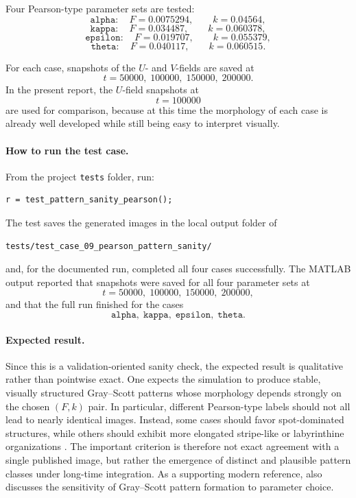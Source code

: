 Four Pearson-type parameter sets are tested:
\[
\texttt{alpha}: \quad F=0.0075294,\qquad k=0.04564,
\]
\[
\texttt{kappa}: \quad F=0.034487,\qquad k=0.060378,
\]
\[
\texttt{epsilon}: \quad F=0.019707,\qquad k=0.055379,
\]
\[
\texttt{theta}: \quad F=0.040117,\qquad k=0.060515.
\]

For each case, snapshots of the \(U\)- and \(V\)-fields are saved at
\[
t = 50000,\;100000,\;150000,\;200000.
\]
In the present report, the \(U\)-field snapshots at
\[
t = 100000
\]
are used for comparison, because at this time the morphology of each case is already well developed while still being easy to interpret visually.

\paragraph{How to run the test case.}
From the project \texttt{tests} folder, run:
\begin{verbatim}
r = test_pattern_sanity_pearson();
\end{verbatim}

The test saves the generated images in the local output folder of
\begin{verbatim}
tests/test_case_09_pearson_pattern_sanity/
\end{verbatim}
and, for the documented run, completed all four cases successfully. The MATLAB output reported that snapshots were saved for all four parameter sets at
\[
t=50000,\;100000,\;150000,\;200000,
\]
and that the full run finished for the cases
\[
\texttt{alpha},\;\texttt{kappa},\;\texttt{epsilon},\;\texttt{theta}.
\]

\paragraph{Expected result.}
Since this is a validation-oriented sanity check, the expected result is qualitative rather than pointwise exact. One expects the simulation to produce stable, visually structured Gray--Scott patterns whose morphology depends strongly on the chosen \((F,k)\) pair. In particular, different Pearson-type labels should not all lead to nearly identical images. Instead, some cases should favor spot-dominated structures, while others should exhibit more elongated stripe-like or labyrinthine organizations \cite{pearson1993,munafo_gray_scott_classes}. The important criterion is therefore not exact agreement with a single published image, but rather the emergence of distinct and plausible pattern classes under long-time integration. As a supporting modern reference, \cite{gandy2022} also discusses the sensitivity of Gray--Scott pattern formation to parameter choice.

